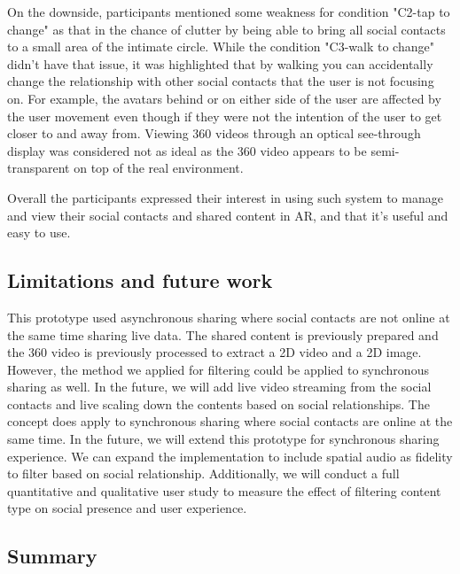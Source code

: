 On the downside, participants mentioned some weakness for condition "C2-tap to change" as that in the chance of clutter by being able to bring all social contacts to a small area of the intimate circle. While the condition "C3-walk to change" didn't have that issue, it was highlighted that by walking you can accidentally change the relationship with other social contacts that the user is not focusing on. For example, the avatars behind or on either side of the user are affected by the user movement even though if they were not the intention of the user to get closer to and away from.
Viewing 360 videos through an optical see-through display was considered not as ideal as the 360 video appears to be semi-transparent on top of the real environment.

Overall the participants expressed their interest in using such system to manage and view their social contacts and shared content in AR, and that it's useful and easy to use. 

\subsection{Limitations and future work}

This prototype used asynchronous sharing where social contacts are not online at the same time sharing live data. The shared content is previously prepared and the 360 video is previously processed to extract a 2D video and a 2D image. However, the method we applied for filtering could be applied to synchronous sharing as well. In the future, we will add live video streaming from the social contacts and live scaling down the contents based on social relationships. 
The concept does apply to synchronous sharing where social contacts are online at the same time. In the future, we will extend this prototype for synchronous sharing experience. We can expand the implementation to include spatial audio as fidelity to filter based on social relationship. 
Additionally, we will conduct a full quantitative and qualitative user study to measure the effect of filtering content type on social presence and user experience. 

\subsection{Summary}

